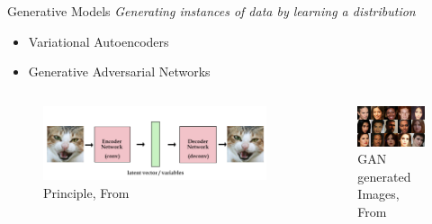 \documentclass[10pt]{beamer}
\begin{document}
\begin{frame}{Generative Models}
\emph{Generating instances of data by learning a distribution}
    \begin{itemize}
    	\item Variational Autoencoders
    	\item Generative Adversarial Networks
    \end{itemize}
    	\begin{columns}
		\begin{column}{0.5\textwidth}
			\begin{figure}
				\caption{Principle, {From \href{http://kvfrans.com/variational-autoencoders-explained/}{}}}
				\includegraphics[width=1.0\textwidth, center, trim=0cm 0cm 0 0cm]{images/autoenc.jpg}
			\end{figure}
		\end{column}
		\begin{column}{0.5\textwidth}
			\begin{figure}
				\caption{GAN generated Images, {From \href{https://blog.heuritech.com/2017/04/11/began-state-of-the-art-generation-of-faces-with-generative-adversarial-networks/}{}}}
				\includegraphics[width=1.0\textwidth, center, trim=0cm 0cm 0 0cm]{images/GAN_Faces.png}
			\end{figure}
		\end{column}
	\end{columns}
\end{frame}
\end{document}
